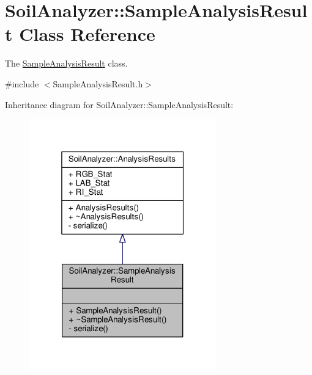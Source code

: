 \hypertarget{class_soil_analyzer_1_1_sample_analysis_result}{}\section{Soil\+Analyzer\+:\+:Sample\+Analysis\+Result Class Reference}
\label{class_soil_analyzer_1_1_sample_analysis_result}


The \hyperlink{class_soil_analyzer_1_1_sample_analysis_result}{Sample\+Analysis\+Result} class.  




{\ttfamily \#include $<$Sample\+Analysis\+Result.\+h$>$}



Inheritance diagram for Soil\+Analyzer\+:\+:Sample\+Analysis\+Result\+:\nopagebreak
\begin{figure}[H]
\begin{center}
\leavevmode
\includegraphics[width=229pt]{class_soil_analyzer_1_1_sample_analysis_result__inherit__graph}
\end{center}
\end{figure}


